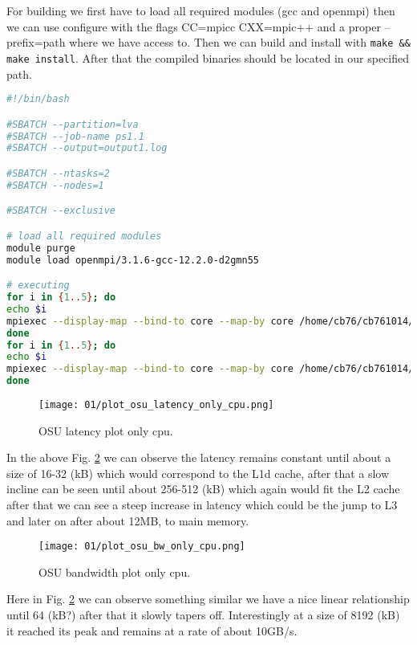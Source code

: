 \documentclass[UTF-8]{article}
\begin{document}
    
    
    
    For building we first have to load all required modules (gcc and openmpi) then we can use configure with the flags CC=mpicc CXX=mpic++ and a proper --prefix=path where we have access to. Then we can build and install with \verb|make && make install|. After that the compiled binaries should be located in our specified path.
    
\begin{lstlisting}[language=bash]
#!/bin/bash

#SBATCH --partition=lva
#SBATCH --job-name ps1.1
#SBATCH --output=output1.log

#SBATCH --ntasks=2
#SBATCH --nodes=1

#SBATCH --exclusive

# load all required modules
module purge
module load openmpi/3.1.6-gcc-12.2.0-d2gmn55 

# executing
for i in {1..5}; do
echo $i
mpiexec --display-map --bind-to core --map-by core /home/cb76/cb761014/exercise1/osu-micro-benchmarks-5.8/executables/libexec/osu-micro-benchmarks/mpi/pt2pt/osu_latency
done
for i in {1..5}; do
echo $i
mpiexec --display-map --bind-to core --map-by core /home/cb76/cb761014/exercise1/osu-micro-benchmarks-5.8/executables/libexec/osu-micro-benchmarks/mpi/pt2pt/osu_bw
done
\end{lstlisting}

    \begin{figure}[H]
    	\centering
    	\texttt{[image: 01/plot\_osu\_latency\_only\_cpu.png]}
    	\caption{OSU latency plot only cpu.}
    	\label{fig:plotosulatencycpu}
    \end{figure}
    
    In the above Fig. \ref{fig:plotosubwcpu} we can observe the latency remains constant until about a size of 16-32 (kB) which would correspond to the L1d cache, after that a slow incline can be seen until about 256-512 (kB) which again would fit the L2 cache after that we can see a steep increase in latency which could be the jump to L3 and later on after about 12MB, to main memory.
    
    \begin{figure}[H]
    	\centering
    	\texttt{[image: 01/plot\_osu\_bw\_only\_cpu.png]}
    	\caption{OSU bandwidth plot only cpu.}
    	\label{fig:plotosubwcpu}
    \end{figure}
    
    Here in Fig. \ref{fig:plotosubwcpu} we can observe something similar we have a nice linear relationship until 64 (kB?) after that it slowly tapers off. Interestingly at a size of 8192 (kB) it reached its peak and remains at a rate of about 10GB/s.
    
\end{document}
